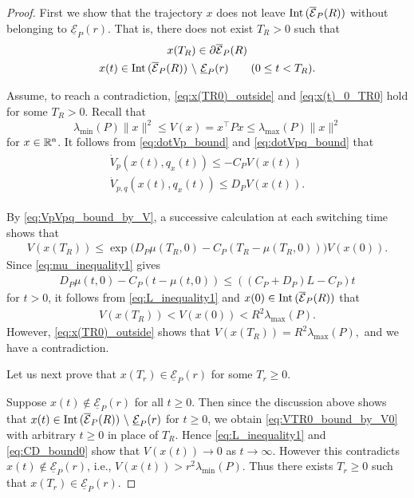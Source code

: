 \documentclass[a4, 11pt]{article}
\newcommand{\Int}{\mathop{\rm Int~\!}}
\begin{document}
\begin{proof}
First we show that the trajectory $x$ does not leave
$\Int (\overline{\mathcal{E}}_P(R))$ without belonging 
to $\underline{\mathcal{E}}_P(r)$. That is, 
there does not exist $T_{R} > 0$
such that 
\begin{gather}
\label{eq:x(TR0)_outside}
x(T_{R}) \in \partial \overline{\mathcal{E}}_P(R) \\
\label{eq:x(t)_0_TR0}
x(t) \in 
\Int (\overline{\mathcal{E}}_P(R))~\backslash~\underline{\mathcal{E}}_P(r)
\qquad (0 \leq t < T_{R}).
\end{gather}

Assume, to reach a contradiction, \eqref{eq:x(TR0)_outside} and
\eqref{eq:x(t)_0_TR0} hold for some $T_{R} > 0$.
Recall that
\begin{equation*}
\lambda_{\min}(P) \|x\|^2 \leq V(x) = x^{\top} Px \leq 
\lambda_{\max}(P) \|x\|^2 
\end{equation*}
for $x \in \mathbb{R}^{\sf n}$.
It follows from
\eqref{eq:dotVp_bound} and \eqref{eq:dotVpq_bound} that
\begin{align}
\label{eq:VpVpq_bound_by_V}
\begin{array}{c}
\dot V_p(x(t),q_x(t)) \leq -C_PV(x(t)) \\[4pt]
\dot V_{p,q}(x(t),q_x(t)) \leq D_P V(x(t)).
\end{array}
\end{align}

By \eqref{eq:VpVpq_bound_by_V}, a successive calculation at each switching time
shows that
\begin{align}
\label{eq:VTR0_bound_by_V0}
V(x(T_{R})) 
\leq 
\exp \big(D_P \mu(T_{R},0)-C_P(T_{R} - \mu(T_{R},0))\big) 
V(x(0)).
\end{align}
Since \eqref{eq:mu_inequality1} gives
\begin{align}
D_P \mu(t,0)-C_P(t - \mu(t,0))
\leq
\left(
\left(
C_P + 
D_P
\right) L - 
C_P
\right)t
\label{eq:CD_bound0}
\end{align}
for $t > 0$,
it follows from \eqref{eq:L_inequality1} and 
$x(0) \in \Int(\overline{\mathcal{E}}_P(R))$ that
\begin{align*}
V(x(T_{R})) < V(x(0)) < R^2 \lambda_{\max} (P).
\end{align*}
However, \eqref{eq:x(TR0)_outside} shows that
$
V(x(T_{R})) 
= R^2 \lambda_{\max} (P),
$
and we have a contradiction.

Let us next prove that
$x(T_{r}) \in \underline{\mathcal{E}}_P(r)$ for some
$T_{r} \geq 0$.

Suppose $x(t) \not\in \underline{\mathcal{E}}_P(r)$ for 
all $t \geq 0$. Then since the discussion above shows that 
$x(t) \in \Int (
\overline{\mathcal{E}}_P(R))~\backslash~\underline{\mathcal{E}}_P(r)$
for $t \geq 0$, we obtain \eqref{eq:VTR0_bound_by_V0} with arbitrary
$t \geq 0$ in place of $T_{R}$.
Hence \eqref{eq:L_inequality1} and \eqref{eq:CD_bound0} show that
$V(x(t)) \to 0$ as $t \to \infty$.
However this contradicts
$x(t) \not\in \underline{\mathcal{E}}_P(r)$, i.e.,
$V(x(t)) > r^2 \lambda_{\min}(P)$. Thus there exists 
$T_{r} \geq 0$ such that 
$x(T_{r}) \in \underline{\mathcal{E}}_P(r)$.
\end{proof}
\end{document}
